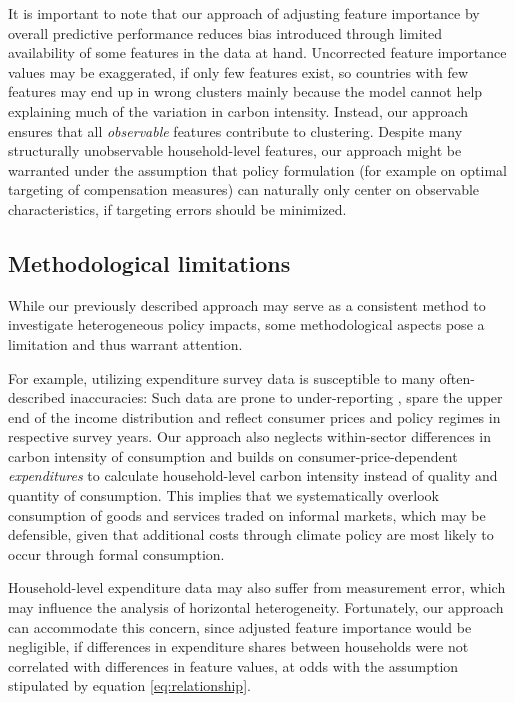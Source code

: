 \documentclass[12pt, a4paper]{article}
\begin{document}
It is important to note that our approach of adjusting feature importance by overall predictive performance reduces bias introduced through limited availability of some features in the data at hand. Uncorrected feature importance values may be exaggerated, if only few features exist, so countries with few features may end up in wrong clusters mainly because the model cannot help explaining much of the variation in carbon intensity. Instead, our approach ensures that all \textit{observable} features contribute to clustering. Despite many structurally unobservable household-level features, our approach might be warranted under the assumption that policy formulation (for example on optimal targeting of compensation measures) can naturally only center on observable characteristics, if targeting errors should be minimized.

\subsection{Methodological limitations}

While our previously described approach may serve as a consistent method to investigate heterogeneous policy impacts, some methodological aspects pose a limitation and thus warrant attention.

For example, utilizing expenditure survey data is susceptible to many often-described inaccuracies: Such data are prone to under-reporting \autocite{Meyer.2015}, spare the upper end of the income distribution \autocite{Blanchet.2022} and reflect consumer prices and policy regimes in respective survey years. Our approach also neglects within-sector differences in carbon intensity of consumption and builds on consumer-price-dependent \textit{expenditures} to calculate household-level carbon intensity instead of quality and quantity of consumption. This implies that we systematically overlook consumption of goods and services traded on informal markets, which may be defensible, given that additional costs through climate policy are most likely to occur through formal consumption.

Household-level expenditure data may also suffer from measurement error, which may influence the analysis of horizontal heterogeneity. Fortunately, our approach can accommodate this concern, since adjusted feature importance would be negligible, if differences in expenditure shares between households were not correlated with differences in feature values, at odds with the assumption stipulated by equation \ref{eq:relationship}.
\end{document}
